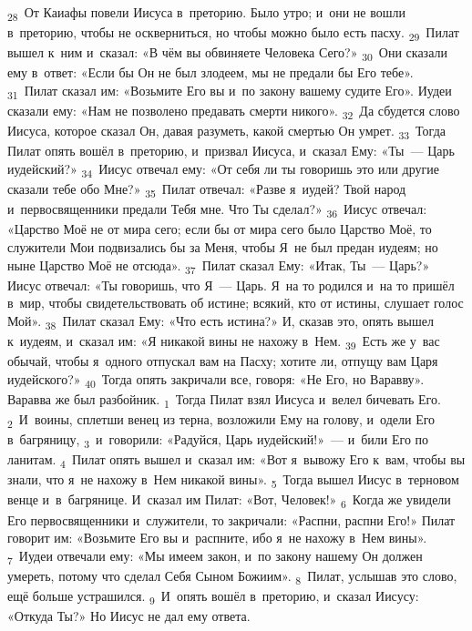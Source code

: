 \documentclass[a4paper,12pt]{article}
\begin{document}
\textsubscript{28}~От Каиафы повели Иисуса в~преторию. Было утро; и~они не вошли в~преторию, чтобы не оскверниться, но чтобы можно было есть пасху.
\textsubscript{29}~Пилат вышел к~ним и~сказал: «В чём вы обвиняете Человека Сего?»
\textsubscript{30}~Они сказали ему в~ответ: «Если бы Он не был злодеем, мы не предали бы Его тебе».
\textsubscript{31}~Пилат сказал им: «Возьмите Его вы и~по закону вашему судите Его». Иудеи сказали ему: «Нам не позволено предавать смерти никого».
\textsubscript{32}~Да сбудется слово Иисуса, которое сказал Он, давая разуметь, какой смертью Он умрет.
\textsubscript{33}~Тогда Пилат опять вошёл в~преторию, и~призвал Иисуса, и~сказал Ему: «Ты~--- Царь иудейский?»
\textsubscript{34}~Иисус отвечал ему: «От себя ли ты говоришь это или другие сказали тебе обо Мне?»
\textsubscript{35}~Пилат отвечал: «Разве я~иудей? Твой народ и~первосвященники предали Тебя мне. Что Ты сделал?»
\textsubscript{36}~Иисус отвечал: «Царство Моё не от мира сего; если бы от мира сего было Царство Моё, то служители Мои подвизались бы за Меня, чтобы Я~не был предан иудеям; но ныне Царство Моё не отсюда».
\textsubscript{37}~Пилат сказал Ему: «Итак, Ты~--- Царь?» Иисус отвечал: «Ты говоришь, что Я~— Царь. Я~на то родился и~на то пришёл в~мир, чтобы свидетельствовать об истине; всякий, кто от истины, слушает голос Мой».
\textsubscript{38}~Пилат сказал Ему: «Что есть истина?» И, сказав это, опять вышел к~иудеям, и~сказал им: «Я никакой вины не нахожу в~Нем.
\textsubscript{39}~Есть же у~вас обычай, чтобы я~одного отпускал вам на Пасху; хотите ли, отпущу вам Царя иудейского?»
\textsubscript{40}~Тогда опять закричали все, говоря: «Не Его, но Варавву». Варавва же был разбойник.
\textsubscript{1}~Тогда Пилат взял Иисуса и~велел бичевать Его.
\textsubscript{2}~И~воины, сплетши венец из терна, возложили Ему на голову, и~одели Его в~багряницу,
\textsubscript{3}~и~говорили: «Радуйся, Царь иудейский!»~--- и~били Его по ланитам.
\textsubscript{4}~Пилат опять вышел и~сказал им: «Вот я~вывожу Его к~вам, чтобы вы знали, что я~не нахожу в~Нем никакой вины».
\textsubscript{5}~Тогда вышел Иисус в~терновом венце и~в~багрянице. И~сказал им Пилат: «Вот, Человек!»
\textsubscript{6}~Когда же увидели Его первосвященники и~служители, то закричали: «Распни, распни Его!» Пилат говорит им: «Возьмите Его вы и~распните, ибо я~не нахожу в~Нем вины».
\textsubscript{7}~Иудеи отвечали ему: «Мы имеем закон, и~по закону нашему Он должен умереть, потому что сделал Себя Сыном Божиим».
\textsubscript{8}~Пилат, услышав это слово, ещё больше устрашился.
\textsubscript{9}~И~опять вошёл в~преторию, и~сказал Иисусу: «Откуда Ты?» Но Иисус не дал ему ответа.
\end{document}
